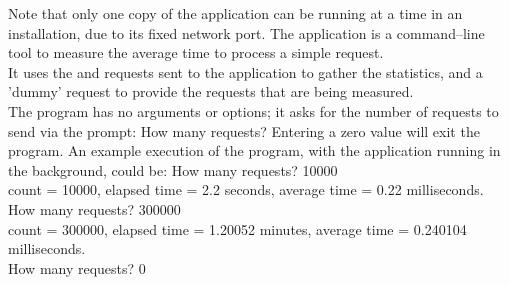 Note that only one copy of the  application can be
running at a time in an \mplusm{} installation, due to its fixed \yarp{} network port.
The  application is a command--line tool to
measure the average time to process a simple request.\\

It uses the  and
 requests sent to the
 application to gather the statistics, and a
'dummy' request to provide the requests that are being measured.\\

The program has no arguments or options; it asks for the number of requests to send via
the prompt:
\outputBegin{}
How many requests?
\outputEnd{}
Entering a zero value will exit the program.
An example execution of the program, with the 
application running in the background, could be:
\outputBegin{}
How many requests? 10000\\
count = 10000, elapsed time = 2.2 seconds, average time = 0.22 milliseconds.\\
How many requests? 300000\\
count = 300000, elapsed time = 1.20052 minutes, average time = 0.240104 milliseconds.\\
How many requests? 0\\
\outputEnd{}
\secondaryEnd{}
\primaryEnd{}
